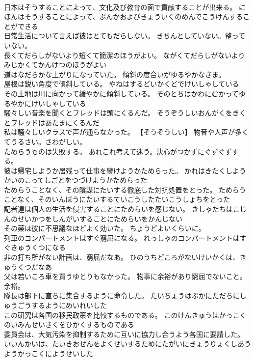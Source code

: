 \documentclass[8pt]{extreport}
\begin{document}
\begin{CJK}{UTF8}{min}
\\	日本はそうすることによって、文化及び教育の面で貢献することが出来る。	にほんはそうすることによって、ぶんかおよびきょういくのめんでこうけんすることができる 
\\	日常生活について言えば彼はとてもだらしない。	きちんとしていない。整っていない。
\\	長くてだらしがないより短くて簡潔のほうがよい。	ながくてだらしがないよりみじかくてかんけつのほうがよい 
\\	道はなだらかな上がりになっていた。	傾斜の度合いがゆるやかなさま。
\\	屋根は鋭い角度で傾斜している。	やねはするどいかくどでけいしゃしている 
\\	その土地は川に向かって緩やかに傾斜している。	そのとちはかわにむかってゆるやかにけいしゃしている 
\\	騒々しい音楽を聞くとフレッドは頭にくるんだ。	そうぞうしいおんがくをきくとフレッドはあたまにくるんだ 
\\	私は騒々しいクラスで声が通らなかった。	【そうぞうしい】 物音や人声が多くてうるさい。さわがしい。
\\	ためらうものは失敗する。	あれこれ考えて迷う。決心がつかずにぐずぐずする。
\\	彼は帰宅しようか居残って仕事を続けようかためらった。	かれはきたくしようかいのこってしごとをつづけようかためらった 
\\	ためらうことなく、その陰謀にたいする徹底した対抗処置をとった。	ためらうことなく、そのいんぼうにたいするていこうしたたいこうしょちをとった 
\\	記者達は個人の生活を侵害することにためらいを感じない。	きしゃたちはこじんのせいかつをしんがいすることにためらいをかんじない 
\\	その薬は彼に不思議なほどよく効いた。	ちょうどよいくらいに。
\\	列車のコンパートメントはすぐ窮屈になる。	れっしゃのコンパートメントはすぐきゅうくつになる 
\\	非の打ち所がない計画は、窮屈だなあ。	ひのうちどころがないけいかくは、きゅうくつだなあ 
\\	父は若いころ車を買うゆとりもなかった。	物事に余裕があり窮屈でないこと。余裕。
\\	隊長は部下に直ちに集合するように命令した。	たいちょうはぶかにただちにしゅうごうするようにめいれいした 
\\	この研究は各国の移民政策を比較するものである。	このけんきゅうはかっこくのいみんせいさくをひかくするものである 
\\	委員会は、大気汚染を抑制するために互いに協力し合うよう各国に要請した。	いいんかいは、たいきおせんをよくせいするためにたがいにきょうりょくしあうようかっこくにようせいした 

\end{CJK}
\end{document}
